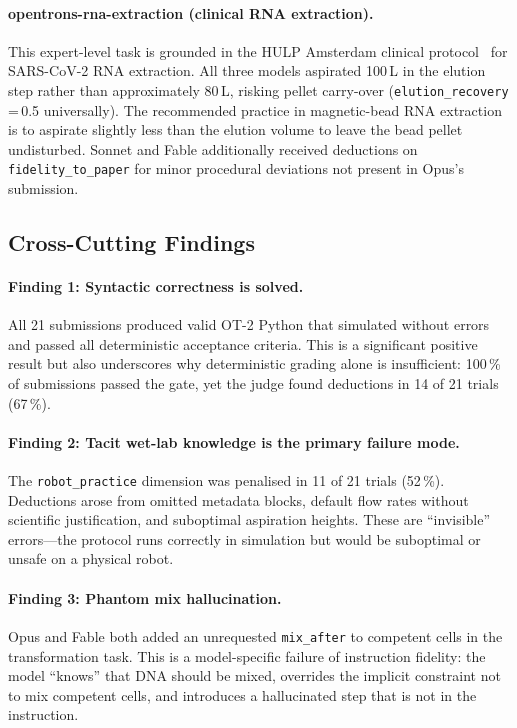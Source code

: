 \documentclass[11pt,a4paper]{article}
\begin{document}
\paragraph{opentrons-rna-extraction (clinical RNA extraction).}
This expert-level task is grounded in the HULP Amsterdam clinical
protocol~\citep{steur2021hulp} for SARS-CoV-2 RNA extraction.
All three models aspirated 100\,\textmu L in the elution step rather than
approximately 80\,\textmu L, risking pellet carry-over
(\texttt{elution\_recovery}\,=\,0.5 universally).
The recommended practice in magnetic-bead RNA extraction is to aspirate
slightly less than the elution volume to leave the bead pellet undisturbed.
Sonnet and Fable additionally received deductions on \texttt{fidelity\_to\_paper}
for minor procedural deviations not present in Opus's submission.

\subsection{Cross-Cutting Findings}
\label{sec:crosscutting}

\paragraph{Finding 1: Syntactic correctness is solved.}
All 21 submissions produced valid OT-2 Python that simulated without
errors and passed all deterministic acceptance criteria.
This is a significant positive result but also underscores why deterministic
grading alone is insufficient: 100\,\% of submissions passed the gate, yet
the judge found deductions in 14 of 21 trials (67\,\%).

\paragraph{Finding 2: Tacit wet-lab knowledge is the primary failure mode.}
The \texttt{robot\_practice} dimension was penalised in 11 of 21 trials
(52\,\%).
Deductions arose from omitted metadata blocks, default flow rates without
scientific justification, and suboptimal aspiration heights.
These are ``invisible'' errors---the protocol runs correctly in simulation
but would be suboptimal or unsafe on a physical robot.

\paragraph{Finding 3: Phantom mix hallucination.}
Opus and Fable both added an unrequested \texttt{mix\_after} to competent
cells in the transformation task.
This is a model-specific failure of instruction fidelity: the model
``knows'' that DNA should be mixed, overrides the implicit constraint not
to mix competent cells, and introduces a hallucinated step that is not
in the instruction.
\end{document}
